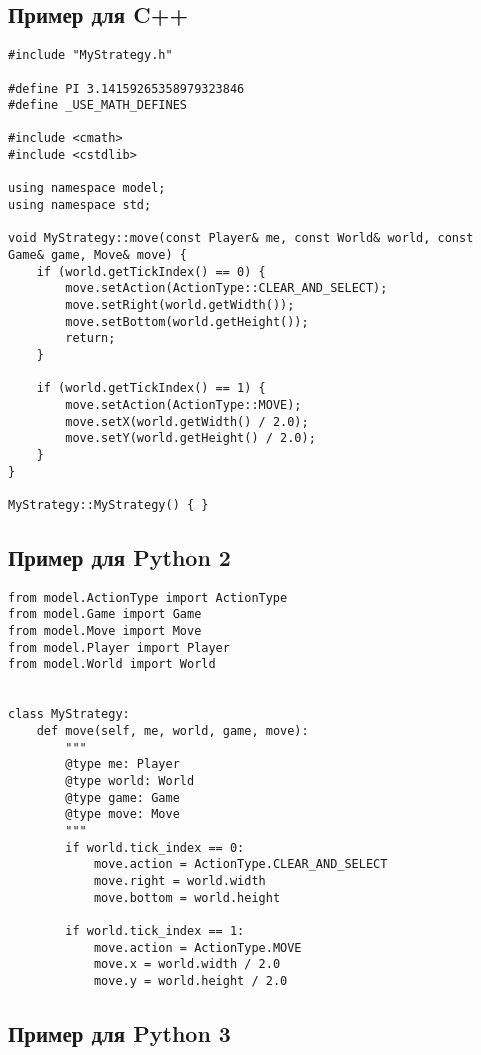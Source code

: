 \newpage
\subsection{Пример для C++}

\begin{verbatim}
#include "MyStrategy.h"

#define PI 3.14159265358979323846
#define _USE_MATH_DEFINES

#include <cmath>
#include <cstdlib>

using namespace model;
using namespace std;

void MyStrategy::move(const Player& me, const World& world, const Game& game, Move& move) {
    if (world.getTickIndex() == 0) {
        move.setAction(ActionType::CLEAR_AND_SELECT);
        move.setRight(world.getWidth());
        move.setBottom(world.getHeight());
        return;
    }

    if (world.getTickIndex() == 1) {
        move.setAction(ActionType::MOVE);
        move.setX(world.getWidth() / 2.0);
        move.setY(world.getHeight() / 2.0);
    }
}

MyStrategy::MyStrategy() { }
\end{verbatim}

\newpage
\subsection{Пример для Python 2}

\begin{verbatim}
from model.ActionType import ActionType
from model.Game import Game
from model.Move import Move
from model.Player import Player
from model.World import World


class MyStrategy:
    def move(self, me, world, game, move):
        """
        @type me: Player
        @type world: World
        @type game: Game
        @type move: Move
        """
        if world.tick_index == 0:
            move.action = ActionType.CLEAR_AND_SELECT
            move.right = world.width
            move.bottom = world.height

        if world.tick_index == 1:
            move.action = ActionType.MOVE
            move.x = world.width / 2.0
            move.y = world.height / 2.0
\end{verbatim}

\subsection{Пример для Python 3}

